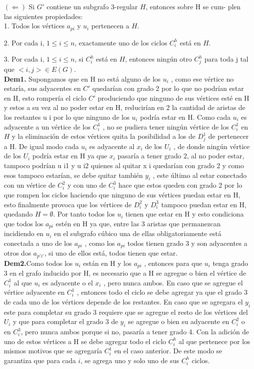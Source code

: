 \documentclass[
10pt, %
a4paper, %
oneside, %
headinclude,footinclude, %
BCOR5mm, %
]{scrartcl}
\begin{document}
$(\Leftarrow )$ Si $G'$ contiene un subgrafo 3-regular $H$, entonces sobre H se cum-
plen las siguientes propiedades: \\


1. Todos los vértices $a_{pi}$ y $u_i$ pertenecen a $H$.

2. Por cada i, $1 \leq i \leq n$, exactamente uno de los ciclos $C^h_i$ está en $H$.

3. Por cada i, $1 \leq i \leq n$, si $C^h_i$ está en $H$, entonces ningún otro $C^h_j$ para
toda j tal que $< i, j > \in E(G)$. \\

\textbf{Dem1.} Supongamos que en H no está alguno de los $u_i$ , como ese vértice
no estaría, sus adyacentes en $C'$ quedarían con grado 2 por lo que no podrían
estar en H, esto rompería el ciclo $C'$ produciendo que ninguno de sus vértices
esté en H y estos a su vez al no poder estar en H, reducirían en 2 la cantidad
de aristas de los restantes u i por lo que ninguno de los $u_i$ podría estar en H.
Como cada $u_i$ es adyacente a un vértice de los $C^1_i$ , no se pudiera tener ningún
vértice de los $C^1_i$ en $H$ y la eliminación de estos vértices quita la posibilidad a
los de $D^1_j$ de pertenecer a H. De igual modo cada $u_i$ es adyacente al $x_i$ de los
$U_i$ , de donde ningún vértice de los $U_i$ podría estar en H ya que $x_i$ pasaría a
tener grado 2, al no poder estar, tampoco podrían u i1 y u i2 quienes al quitar x i
quedarían con grado 2 y como esos tampoco estarían, se debe quitar también $y_i$ ,
este último al estar conectado con un vértice de $C^2_i$ y con uno de $C^3_i$ hace que
estos queden con grado 2 por lo que rompen los ciclos haciendo que ninguno de
sus vértices puedan estar en H, esto finalmente provoca que los vértices de $D^2_i$
y $D^3_i$ tampoco puedan estar en H, quedando $H = \emptyset$.
Por tanto todos los $u_i$ tienen que estar en H y esto condiciona que todos
los $a_{pi}$ estén en H ya que, entre las 3 aristas que permanezcan incidiendo en $u_i$
en el subgrafo cúbico una de ellas obligatoriamente está conectada a uno de los
$a_{pi}$ , como los $a_{pi}$ todos tienen grado 3 y son adyacentes a otros dos $a_{p'i'}$, si uno
de ellos está, todos tienen que estar. \\


\textbf{Dem2.}Como todos los $u_i$ están en H y los $a_{pi}$ , entonces para que $u_i$ tenga
grado 3 en el grafo inducido por H, es necesario que a H se agregue o bien el
vértice de $C^1_i$ al que $u_i$ es adyacente o el $x_i$ , pero nunca ambos. En caso que
se agregue el vértice adyacente en $C^1_i$ , entonces todo el ciclo se debe agregar ya
que el grado 3 de cada uno de los vértices depende de los restantes. En caso que
se agregara el $y_i$ este para completar su grado 3 requiere que se agregue el resto de los vértices del $U_i$ y que para completar el grado 3 de $y_i$ se agregue o bien su
adyacente en $C^2_i$ o en $C^3_i$, pero nunca ambos porque si no, pasaría a tener grado
4. Con la adición de uno de estos vértices a H se debe agregar todo el ciclo $C^h_i$ al
que pertenece por los mismos motivos que se agregaría $C^1_i$ en el caso anterior. De
este modo se garantiza que para cada $i$, se agrega uno y solo uno de sus $C^h_i$ ciclos.\\
\end{document}
